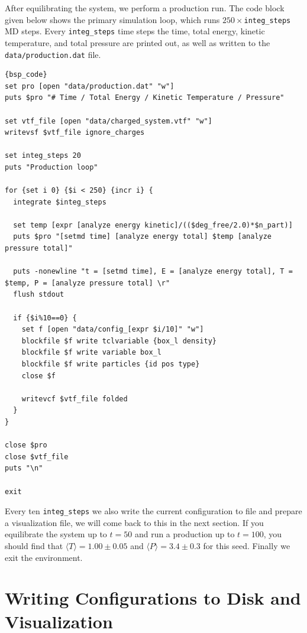 \documentclass[
a4paper,                        %
11pt,                           %
twoside,                        %
footsepline,                    %
headsepline,                    %
headexclude,                    %
footexclude,                    %
pagesize,                       %
]{scrartcl}
\begin{document}
After equilibrating the system, we perform a production run. The code block given below shows the primary simulation loop, which runs $250\times$\verb|integ_steps| MD steps. Every \verb|integ_steps| time steps the time, total energy, kinetic temperature, and total pressure are printed out, as well as written to the \texttt{data/production.dat} file. 

{\small\vspace{0,2cm}
\begin{lstlisting}[firstnumber= auto]{bsp_code}
set pro [open "data/production.dat" "w"]
puts $pro "# Time / Total Energy / Kinetic Temperature / Pressure"

set vtf_file [open "data/charged_system.vtf" "w"]
writevsf $vtf_file ignore_charges

set integ_steps 20
puts "Production loop"

for {set i 0} {$i < 250} {incr i} {
  integrate $integ_steps

  set temp [expr [analyze energy kinetic]/(($deg_free/2.0)*$n_part)]
  puts $pro "[setmd time] [analyze energy total] $temp [analyze pressure total]"

  puts -nonewline "t = [setmd time], E = [analyze energy total], T = $temp, P = [analyze pressure total] \r"
  flush stdout

  if {$i%10==0} {
    set f [open "data/config_[expr $i/10]" "w"]
    blockfile $f write tclvariable {box_l density}
    blockfile $f write variable box_l
    blockfile $f write particles {id pos type}
    close $f

    writevcf $vtf_file folded
  }
}

close $pro
close $vtf_file
puts "\n"

exit
\end{lstlisting}\vspace{0,2cm}
}

\noindent Every ten \verb|integ_steps| we also write the current configuration to file and prepare a visualization file, we will come back to this in the next section. If you equilibrate the system up to $t = 50$ and run a production up to $t = 100$, you should find that $\langle T \rangle = 1.00 \pm 0.05$ and $\langle P \rangle =  3.4 \pm 0.3$ for this seed. Finally we exit the \es{} environment.

\section{Writing Configurations to Disk and Visualization}
\end{document}
